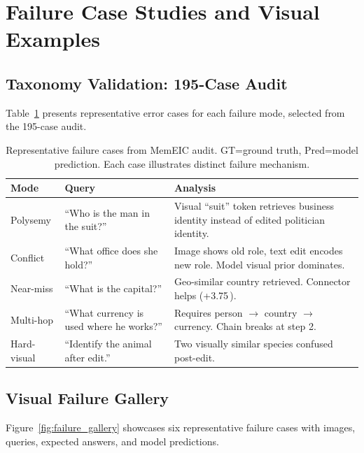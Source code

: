 \documentclass[11pt]{article}
\newcommand{\pp}{\,\text{pp}}
\begin{document}
\appendix

\section{Failure Case Studies and Visual Examples}
\label{app:failure_cases}

\subsection{Taxonomy Validation: 195-Case Audit}

Table~\ref{tab:failure_cases} presents representative error cases for each
failure mode, selected from the 195-case audit.

\begin{table}[t]
\centering
\caption{Representative failure cases from MemEIC audit. GT=ground truth,
Pred=model prediction. Each case illustrates distinct failure mechanism.}
\label{tab:failure_cases}
\small
\begin{tabularx}{\linewidth}{@{}llX@{}}
\toprule
\textbf{Mode} & \textbf{Query} & \textbf{Analysis} \\
\midrule
Polysemy & ``Who is the man in the suit?'' & Visual ``suit'' token retrieves
  business identity instead of edited politician identity. \\
Conflict & ``What office does she hold?'' & Image shows old role, text edit
  encodes new role. Model visual prior dominates. \\
Near-miss & ``What is the capital?'' & Geo-similar country retrieved.
  Connector helps (+3.75\pp). \\
Multi-hop & ``What currency is used where he works?'' &  Requires
  person $\to$ country $\to$ currency. Chain breaks at step 2. \\
Hard-visual & ``Identify the animal after edit.'' & Two visually similar
  species confused post-edit. \\
\bottomrule
\end{tabularx}
\end{table}

\subsection{Visual Failure Gallery}

Figure~\ref{fig:failure_gallery} showcases six representative failure cases with
images, queries, expected answers, and model predictions.
\end{document}
